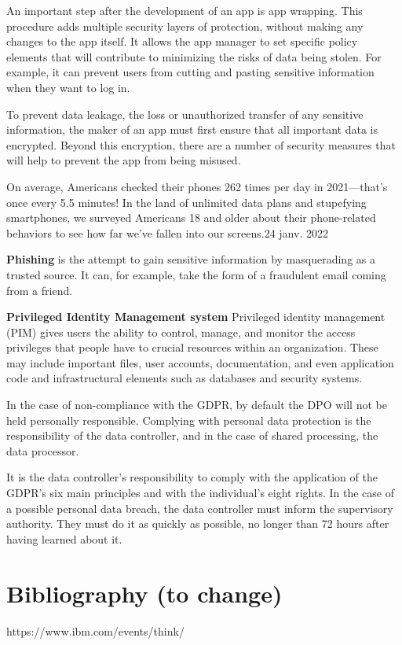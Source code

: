 \begin{itemize}
An important step after the development of an app is app wrapping. This procedure adds multiple security layers of protection, without making any changes to the app itself. It allows the app manager to set specific policy elements that will contribute to minimizing the risks of data being stolen. For example, it can prevent users from cutting and pasting sensitive information when they want to log in.

\blindtext




To prevent data leakage, the loss or unauthorized transfer of any sensitive information, the maker of an app must first ensure that all important data is encrypted. Beyond this encryption, there are a number of security measures that will help to prevent the app from being misused.



On average, Americans checked their phones 262 times per day in 2021—that's once every 5.5 minutes! In the land of unlimited data plans and stupefying smartphones, we surveyed Americans 18 and older about their phone-related behaviors to see how far we've fallen into our screens.24 janv. 2022

 \textbf{Phishing} is the attempt to gain sensitive information by masquerading as a trusted source. It can, for example, take the form of a fraudulent email coming from a friend.


 \textbf{Privileged Identity Management system}
 Privileged identity management (PIM) gives users the ability to control, manage, and monitor the access privileges that people have to crucial resources within an organization. These may include important files, user accounts, documentation, and even application code and infrastructural elements such as databases and security systems.



In the case of non-compliance with the GDPR, by default the DPO will not be held personally responsible. Complying with personal data protection is the responsibility of the data controller, and in the case of shared processing, the data processor.

It is the data controller’s responsibility to comply with the application of the GDPR’s six main principles and with the individual’s eight rights.
In the case of a possible personal data breach, the data controller must inform the supervisory authority. They must do it as quickly as possible, no longer than 72 hours after having learned about it.

\section{Bibliography (to change)}
https://www.ibm.com/events/think/
\blindtext
\end{itemize}


